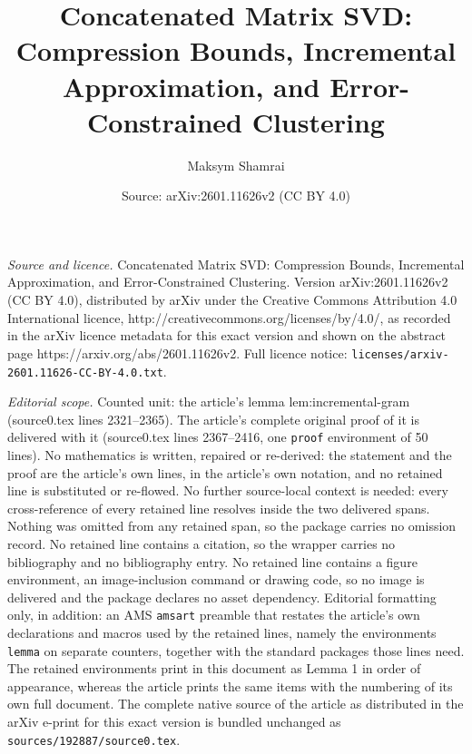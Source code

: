 \documentclass[10pt,a4paper]{amsart}
\title{Concatenated Matrix SVD: Compression Bounds, Incremental Approximation, and Error-Constrained Clustering}
\author{Maksym Shamrai}
\date{Source: arXiv:2601.11626v2 (CC BY 4.0)}
\begin{document}
\maketitle

\noindent\emph{Source and licence.} Concatenated Matrix SVD: Compression Bounds, Incremental Approximation, and Error-Constrained Clustering. Version arXiv:2601.11626v2 (CC BY 4.0), distributed by arXiv under the Creative Commons Attribution 4.0 International licence, http://creativecommons.org/licenses/by/4.0/, as recorded in the arXiv licence metadata for this exact version and shown on the abstract page https://arxiv.org/abs/2601.11626v2. Full licence notice: \texttt{licenses/arxiv-2601.11626-CC-BY-4.0.txt}.\par\smallskip

\noindent\textit{Editorial scope.} Counted unit: the article's lemma lem:incremental-gram (source0.tex lines 2321--2365). The article's complete original proof of it is delivered with it (source0.tex lines 2367--2416, one \texttt{proof} environment of 50 lines). No mathematics is written, repaired or re-derived: the statement and the proof are the article's own lines, in the article's own notation, and no retained line is substituted or re-flowed.  No further source-local context is needed: every cross-reference of every retained line resolves inside the two delivered spans.  Nothing was omitted from any retained span, so the package carries no omission record.  No retained line contains a citation, so the wrapper carries no bibliography and no bibliography entry.  No retained line contains a figure environment, an image-inclusion command or drawing code, so no image is delivered and the package declares no asset dependency.  Editorial formatting only, in addition: an AMS \texttt{amsart} preamble that restates the article's own declarations and macros used by the retained lines, namely the environments \texttt{lemma} on separate counters, together with the standard packages those lines need.  The retained environments print in this document as Lemma 1 in order of appearance, whereas the article prints the same items with the numbering of its own full document.  The complete native source of the article as distributed in the arXiv e-print for this exact version is bundled unchanged as \texttt{sources/192887/source0.tex}.
\end{document}
